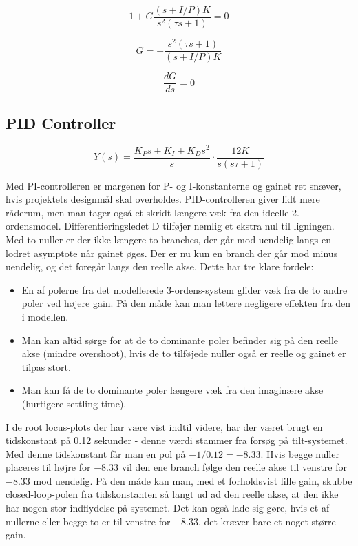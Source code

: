 \begin{equation}
1+G\frac{(s+I/P)K}{s^2(\tau s+1)}=0
\end{equation}

\begin{equation}
G=-\frac{s^2(\tau s+1)}{(s+I/P)K}
\end{equation}

\begin{equation}
\frac{dG}{ds}=0
\end{equation}

\subsection{PID Controller}

\begin{equation}\label{PID_OpenLoop}
Y(s)=\frac{K_{P}s+K_{I}+K_{D}s^2}{s}\cdot\frac{12K}{s(s\tau+1)}
\end{equation}

Med PI-controlleren er margenen for P- og I-konstanterne og gainet ret snæver, hvis projektets designmål skal overholdes. PID-controlleren giver lidt mere råderum, men man tager også et skridt længere væk fra den ideelle 2.-ordensmodel. Differentieringsledet D tilføjer nemlig et ekstra nul til ligningen. Med to nuller er der ikke længere to branches, der går mod uendelig langs en lodret asymptote når gainet øges. Der er nu kun en branch der går mod minus uendelig, og det foregår langs den reelle akse. Dette har tre klare fordele:

\begin{itemize}
	\item 	En af polerne fra det modellerede 3-ordens-system glider væk fra de to andre poler ved højere gain. På den måde kan man lettere negligere effekten fra den i modellen.
	\item  	Man kan altid sørge for at de to dominante poler befinder sig på den 				   	reelle akse (mindre overshoot), hvis de to tilføjede nuller også er reelle og gainet er tilpas stort. 
	\item  	Man kan få de to dominante poler længere væk fra den imaginære akse 					(hurtigere settling time).
\end{itemize}

I de root locus-plots der har være vist indtil videre, har der været brugt en tidskonstant på 0.12 sekunder - denne værdi stammer fra forsøg på tilt-systemet. Med denne tidskonstant får man en pol på $-1/0.12=-8.33$. Hvis begge nuller placeres til højre for $-8.33$ vil den ene branch følge den reelle akse til venstre for $-8.33$ mod uendelig. På den måde kan man, med et forholdsvist lille gain, skubbe closed-loop-polen fra tidskonstanten så langt ud ad den reelle akse, at den ikke har nogen stor indflydelse på systemet. Det kan også lade sig gøre, hvis et af nullerne eller begge to er til venstre for $-8.33$, det kræver bare et noget større gain.

